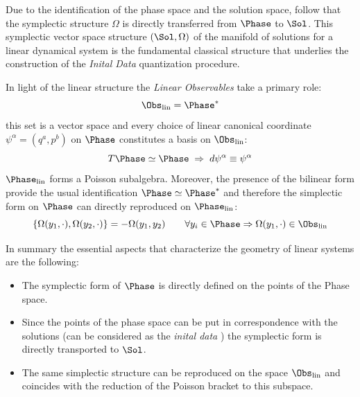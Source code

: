 \documentclass[Main]{subfiles}
\begin{document}
	Due to the identification of the phase space and the solution space, follow that the symplectic structure $\Omega$ is directly transferred from $\Phase$ to $\Sol$. This symplectic vector space structure $( \Sol	, \Omega)$ of the manifold of solutions for a linear dynamical system is the fundamental classical structure that underlies the construction of the \emph{Inital Data} quantization procedure.
	
	In light of the linear structure the \emph{Linear Observables} take a primary role:
	\begin{displaymath}
		\Obs_{\textrm{lin}} = \Phase^*
	\end{displaymath}
	this set is a vector space and every choice of linear canonical coordinate $\psi^\alpha = (q^a, p^b)$ on $\Phase$ constitutes a  basis on $\Obs_{\textrm{lin}} $:
	\begin{displaymath}
		T\Phase \simeq \Phase \; \Rightarrow \; d\psi^\alpha \equiv \psi^\alpha
	\end{displaymath}
	$\Phase_{\textrm{lin}}$ forms a Poisson subalgebra.
	Moreover, the presence of the bilinear form provide the usual identification $\Phase \simeq \Phase^*$ and therefore the simplectic form on $\Phase$ can directly reproduced on $\Phase_{\textrm{lin}} $:
	\begin{displaymath}
		\{ \Omega(y_1, \cdot),\Omega(y_2, \cdot)\} = - \Omega(y_1, y_2) \qquad \forall y_i \in \Phase \Rightarrow \Omega(y_1, \cdot) \in \Obs_\textrm{lin}
	\end{displaymath}

	
	
	
	\begin{TAM}
			In summary the essential aspects that characterize the geometry of linear systems are the following:
		\begin{itemize}
			\item The symplectic form of $\Phase$ is directly defined on the points of the Phase space.
			\item Since the points of the phase space can be put in correspondence with the solutions (can be considered as the \emph{inital data} ) the symplectic form is directly transported to $\Sol$.
			\item The same simplectic structure can be reproduced on the space $\Obs_\textrm{lin}$ and coincides with the reduction of the Poisson bracket to this subspace.
			\end{itemize}
	\end{TAM}


\end{document}
